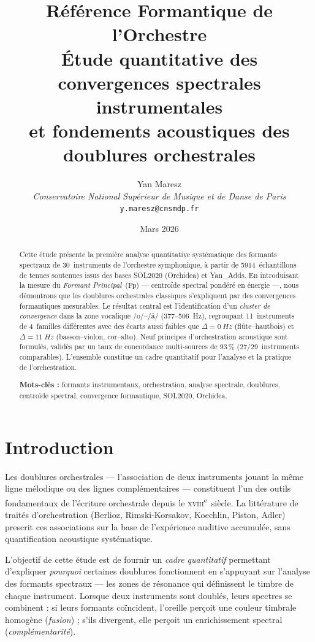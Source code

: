 \documentclass[11pt,a4paper]{article}
\title{%
  \textbf{Référence Formantique de l'Orchestre}\\[6pt]
  \large Étude quantitative des convergences spectrales instrumentales\\
  et fondements acoustiques des doublures orchestrales%
}
\author{%
  Yan Maresz\\
  \textit{Conservatoire National Supérieur de Musique et de Danse de Paris}\\
  \texttt{y.maresz@cnsmdp.fr}%
}
\date{Mars 2026}
\begin{document}
\maketitle

\begin{abstract}
Cette étude présente la première analyse quantitative systématique des
formants spectraux de 30~instruments de l'orchestre symphonique, à partir
de \num{5914}~échantillons de tenues soutenues issus des bases SOL2020
(Orchidea) et Yan\_Adds. En introduisant la mesure du \emph{Formant
Principal}~(Fp) --- centroïde spectral pondéré en énergie ---, nous
démontrons que les doublures orchestrales classiques s'expliquent par des
convergences formantiques mesurables. Le résultat central est
l'identification d'un \emph{cluster de convergence} dans la zone
vocalique /o/--/\r{a}/ (377--506~Hz), regroupant 11~instruments de
4~familles différentes avec des écarts aussi faibles que $\Delta =
\SI{0}{Hz}$ (flûte--hautbois) et $\Delta = \SI{11}{Hz}$
(basson--violon, cor--alto). Neuf principes d'orchestration acoustique
sont formulés, validés par un taux de concordance multi-sources de
93\,\% (27/29~instruments comparables). L'ensemble constitue un cadre
quantitatif pour l'analyse et la pratique de l'orchestration.

\medskip
\noindent\textbf{Mots-clés :} formants instrumentaux, orchestration,
analyse spectrale, doublures, centroïde spectral, convergence
formantique, SOL2020, Orchidea.
\end{abstract}


\section{Introduction}

Les doublures orchestrales --- l'association de deux instruments jouant
la même ligne mélodique ou des lignes complémentaires --- constituent
l'un des outils fondamentaux de l'écriture orchestrale depuis le
\textsc{xviii}\textsuperscript{e}~siècle. La littérature de traités
d'orchestration (Berlioz, Rimski-Korsakov, Koechlin, Piston, Adler)
prescrit ces associations sur la base de l'expérience auditive
accumulée, sans quantification acoustique systématique.

L'objectif de cette étude est de fournir un \emph{cadre quantitatif}
permettant d'expliquer \emph{pourquoi} certaines doublures fonctionnent
en s'appuyant sur l'analyse des formants spectraux --- les zones de
résonance qui définissent le timbre de chaque instrument. Lorsque deux
instruments sont doublés, leurs spectres se combinent : si leurs
formants coïncident, l'oreille perçoit une couleur timbrale homogène
(\emph{fusion}) ; s'ils divergent, elle perçoit un enrichissement
spectral (\emph{complémentarité}).
\end{document}
